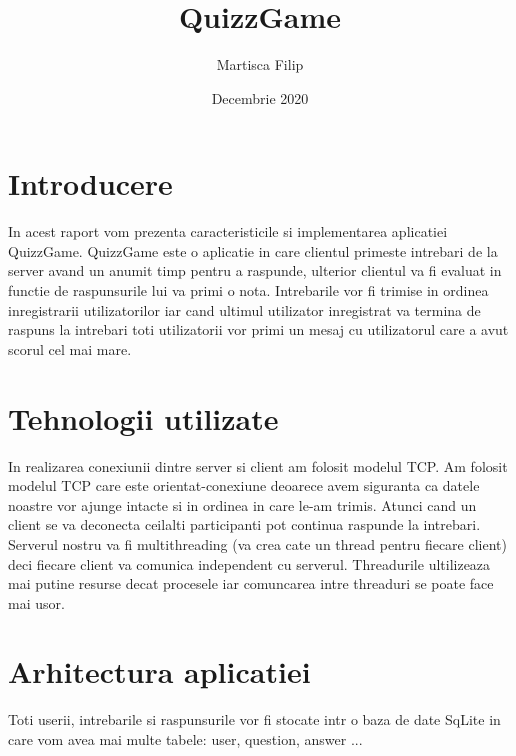 \documentclass[12]{article}
\title{QuizzGame}
\author{Martisca Filip }
\date{Decembrie 2020}
\begin{document}
\maketitle

\section{Introducere}
\hspace{5mm} In acest raport vom prezenta caracteristicile si implementarea aplicatiei QuizzGame. QuizzGame este o aplicatie in care clientul primeste intrebari de la server avand un anumit timp pentru a raspunde, ulterior clientul va fi evaluat in functie de raspunsurile lui va primi o nota.
\State
\hspace{5mm} Intrebarile vor fi trimise in ordinea inregistrarii utilizatorilor iar cand ultimul utilizator inregistrat va termina de raspuns la intrebari toti utilizatorii vor primi un mesaj cu utilizatorul care a avut scorul cel mai mare.

\section{Tehnologii utilizate}
\hspace{5mm} In realizarea conexiunii dintre server si client am folosit modelul TCP. Am folosit modelul TCP care este orientat-conexiune deoarece avem siguranta ca datele noastre vor ajunge intacte si in ordinea in care le-am trimis. Atunci cand un client se va deconecta ceilalti participanti pot continua raspunde la intrebari.  
\State \hspace{5mm} Serverul nostru va fi multithreading (va crea cate un thread pentru fiecare client) deci fiecare client va comunica independent cu serverul. Threadurile ultilizeaza mai putine resurse decat procesele iar comuncarea intre threaduri se poate face mai usor.

\section{Arhitectura aplicatiei}
\hspace{5mm}Toti userii, intrebarile si raspunsurile vor fi stocate intr o baza de date SqLite in care vom avea mai multe tabele: user, question, answer ...  
\end{document}
